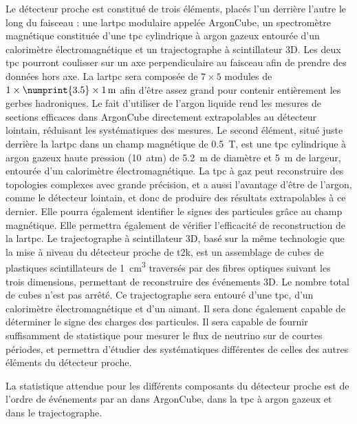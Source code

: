      Le détecteur proche est constitué de trois éléments, placés l'un derrière l'autre le long du faisceau : une \gls{lartpc} modulaire appelée ArgonCube, un spectromètre magnétique constituée d'une \gls{tpc} cylindrique à argon gazeux entourée d'un calorimètre électromagnétique et un trajectographe à scintillateur 3D. Les deux \gls{tpc} pourront coulisser sur un axe perpendiculaire au faisceau afin de prendre des données hors axe. La \gls{lartpc} sera composée de $7\times5$ modules de $1\times\numprint{3.5}\times\SI{1}{\meter}$ afin d'être assez grand pour contenir entièrement les gerbes hadroniques. Le fait d'utiliser de l'argon liquide rend les mesures de sections efficaces dans ArgonCube directement extrapolables au détecteur lointain, réduisant les systématiques des mesures. Le second élément, situé juste derrière la \gls{lartpc} dans un champ magnétique de \SI{0.5}{\tesla}, est une \gls{tpc} cylindrique à argon gazeux haute pression (\SI{10}{atm}) de \SI{5.2}{\meter} de diamètre et \SI{5}{\meter} de largeur, entourée d'un calorimètre électromagnétique. La \gls{tpc} à gaz peut reconstruire des topologies complexes avec grande précision, et a aussi l'avantage d'être de l'argon, comme le détecteur lointain, et donc de produire des résultats extrapolables à ce dernier. Elle pourra également identifier le signes des particules grâce au champ magnétique. Elle permettra également de vérifier l'efficacité de reconstruction de la \gls{lartpc}. Le trajectographe à scintillateur 3D, basé sur la même technologie que la mise à niveau du détecteur proche de \gls{t2k}, est un assemblage de cubes de plastiques scintillateurs de \SI{1}{\centi\meter\cubed} traversés par des fibres optiques suivant les trois dimensions, permettant de reconstruire des événements 3D. Le nombre total de cubes n'est pas arrêté. Ce trajectographe sera entouré d'une \gls{tpc}, d'un calorimètre électromagnétique et d'un aimant. Il sera donc également capable de déterminer le signe des charges des particules. Il sera capable de fournir suffisamment de statistique pour mesurer le flux de neutrino sur de courtes périodes, et permettra d'étudier des systématiques différentes de celles des autres éléments du détecteur proche.

      La statistique attendue pour les différents composants du détecteur proche est de l'ordre de  événements par an dans ArgonCube,  dans la \gls{tpc} à argon gazeux et  dans le trajectographe.

